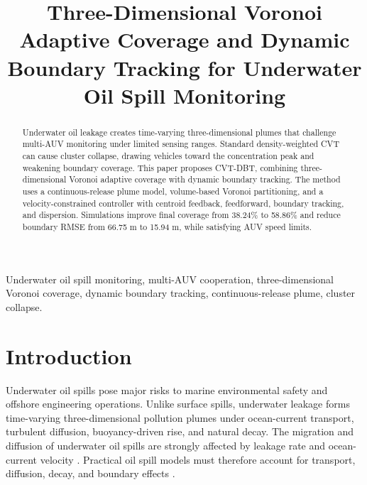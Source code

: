 \documentclass[conference]{IEEEtran}
\begin{document}
\title{Three-Dimensional Voronoi Adaptive Coverage and Dynamic Boundary Tracking for Underwater Oil Spill Monitoring}

\author{
}
\maketitle

\begin{abstract}
Underwater oil leakage creates time-varying three-dimensional plumes that challenge multi-AUV monitoring under limited sensing ranges. Standard density-weighted CVT can cause cluster collapse, drawing vehicles toward the concentration peak and weakening boundary coverage. This paper proposes CVT-DBT, combining three-dimensional Voronoi adaptive coverage with dynamic boundary tracking. The method uses a continuous-release plume model, volume-based Voronoi partitioning, and a velocity-constrained controller with centroid feedback, feedforward, boundary tracking, and dispersion. Simulations improve final coverage from 38.24\% to 58.86\% and reduce boundary RMSE from 66.75 m to 15.94 m, while satisfying AUV speed limits.
\end{abstract}

\begin{IEEEkeywords}
Underwater oil spill monitoring, multi-AUV cooperation, three-dimensional Voronoi coverage, dynamic boundary tracking, continuous-release plume, cluster collapse.
\end{IEEEkeywords}

\section{Introduction}
Underwater oil spills pose major risks to marine environmental safety and offshore engineering operations. Unlike surface spills, underwater leakage forms time-varying three-dimensional pollution plumes under ocean-current transport, turbulent diffusion, buoyancy-driven rise, and natural decay. The migration and diffusion of underwater oil spills are strongly affected by leakage rate and ocean-current velocity \cite{zhang2020oil}. Practical oil spill models must therefore account for transport, diffusion, decay, and boundary effects \cite{fingas2022overview}.
\end{document}
